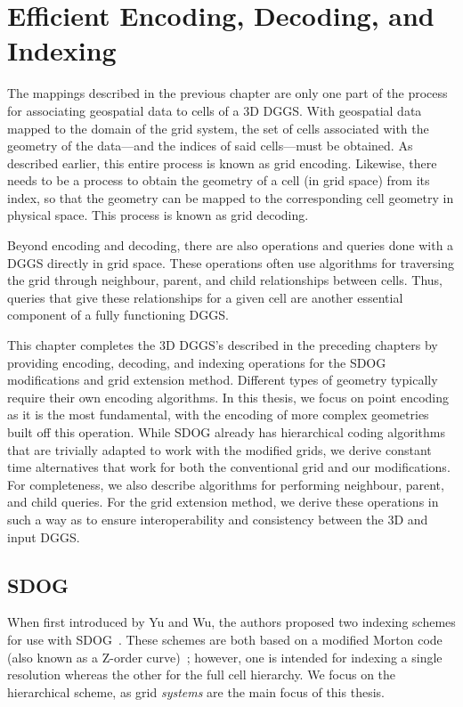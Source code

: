 \chapter{Efficient Encoding, Decoding, and Indexing} \label{chap:coding}
The mappings described in the previous chapter are only one part of the process for associating geospatial data to cells of a 3D DGGS.
With geospatial data mapped to the domain of the grid system, the set of cells associated with the geometry of the data---and the indices of said cells---must be obtained.
As described earlier, this entire process is known as grid encoding.
Likewise, there needs to be a process to obtain the geometry of a cell (in grid space) from its index, so that the geometry can be mapped to the corresponding cell geometry in physical space.
This process is known as grid decoding.


Beyond encoding and decoding, there are also operations and queries done with a DGGS directly in grid space.
These operations often use algorithms for traversing the grid through neighbour, parent, and child relationships between cells.
Thus, queries that give these relationships for a given cell are another essential component of a fully functioning DGGS.


This chapter completes the 3D DGGS's described in the preceding chapters by providing encoding, decoding, and indexing operations for the SDOG modifications and grid extension method.
Different types of geometry typically require their own encoding algorithms.
In this thesis, we focus on point encoding as it is the most fundamental, with the encoding of more complex geometries built off this operation.
While SDOG already has hierarchical coding algorithms~\cite{yu2009sdog, yu2009coding} that are trivially adapted to work with the modified grids, we derive constant time alternatives that work for both the conventional grid and our modifications.
For completeness, we also describe algorithms for performing neighbour, parent, and child queries.
For the grid extension method, we derive these operations in such a way as to ensure interoperability and consistency between the 3D and input DGGS.


\section{SDOG}
When first introduced by Yu and Wu, the authors proposed two indexing schemes for use with SDOG~\cite{yu2009coding}.
These schemes are both based on a modified Morton code (also known as a Z-order curve)~\cite{morton}; however, one is intended for indexing a single resolution whereas the other for the full cell hierarchy.
We focus on the hierarchical scheme, as grid \textit{systems} are the main focus of this thesis.



